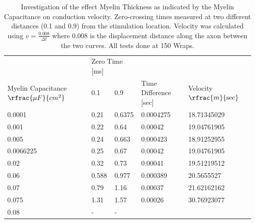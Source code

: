 \documentclass[12pt]{article}
\begin{document}
\begin{table}[h!]
\begin{tabular}{|l|l|l|l|l|}
                  & \multicolumn{2}{l}{Zero Time [ms]} &                     &                     \\
Myelin Capacitance $\rfrac{\mu F}{cm^{2}}$ & 0.1              & 0.9             & Time Difference [sec] & Velocity $\rfrac{m}{\text{sec}}$ \\ \hline\hline
0.0001                                   & 0.21  & 0.6375 & 0.0004275             & 18.71345029        \\
0.001                                    & 0.22  & 0.64   & 0.00042               & 19.04761905        \\
0.005                                    & 0.24  & 0.663  & 0.000423              & 18.91252955        \\
0.0066225                                & 0.25  & 0.67   & 0.00042               & 19.04761905        \\
0.02                                     & 0.32  & 0.73   & 0.00041               & 19.51219512        \\
0.06                                     & 0.588 & 0.977  & 0.000389              & 20.5655527         \\
0.07                                     & 0.79  & 1.16   & 0.00037               & 21.62162162        \\
0.075                                    & 1.31  & 1.57   & 0.00026               & 30.76923077        \\
0.08                                     & -     & -      &                       &    
\end{tabular}
\caption{Investigation of the effect Myelin Thickness as indicated by the Myelin Capacitance on conduction velocity. Zero-crossing times measured at two different distances (0.1 and 0.9) from the stimulation location. Velocity was calculated using $v = \frac{0.008}{\Delta t}$ where 0.008 is the displacement distance along the axon between the two curves. All tests done at 150 Wraps. }
\label{table:2b}
\end{table}
\end{document}
